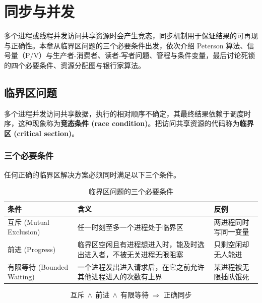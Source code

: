 \clearpage
\begingroup
\let\clearpage\relax
\let\cleardoublepage\relax
\vspace*{\fill}
\chapter{同步与并发}
\begin{center}
多个进程或线程并发访问共享资源时会产生竞态，同步机制用于保证结果的可再现与正确性。本章从临界区问题的三个必要条件出发，依次介绍 Peterson 算法、信号量（P/V）与生产者-消费者、读者-写者问题、管程与条件变量，最后讨论死锁的四个必要条件、资源分配图与银行家算法。
\end{center}
\vspace*{\fill}
\endgroup
\clearpage

\section{临界区问题}

多个进程并发访问共享数据，执行的相对顺序不确定，其最终结果依赖于调度时序，这种现象称为\textbf{竞态条件 (race condition)}。把访问共享资源的代码称为\textbf{临界区 (critical section)}。

\subsection{三个必要条件}

任何正确的临界区解决方案必须同时满足以下三个条件。

\begin{table}[H]
\centering
\caption{临界区问题的三个必要条件}
\begin{tabulary}{\textwidth}{LLL}
\toprule
条件 & 含义 & 反例 \\
\midrule
互斥 (Mutual Exclusion) & 任一时刻至多一个进程处于临界区 & 两进程同时写同一变量 \\
前进 (Progress) & 临界区空闲且有进程想进入时，能及时选出进入者，不被无关进程无限阻塞 & 只剩空闲却无人能进 \\
有限等待 (Bounded Waiting) & 一个进程发出进入请求后，在它之前允许其他进程进入的次数有上界 & 某进程被无限插队饿死 \\
\bottomrule
\end{tabulary}
\end{table}

\begin{equation}
    \text{互斥} \ \wedge\ \text{前进} \ \wedge\ \text{有限等待} \;\Longrightarrow\; \text{正确同步}
\end{equation}

